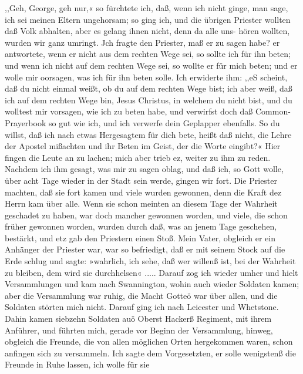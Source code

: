 
,,Geh, George, geh nur,« so fürchtete ich, daß, wenn ich nicht
ginge, man sage, ich sei meinen Eltern ungehorsam; so ging ich,
und die übrigen Priester wollten daß Volk abhalten, aber es
gelang ihnen nicht, denn da alle uns- hören wollten, wurden wir
ganz umringt. Jch fragte den Priester, maß er zu sagen habe?
er antwortete, wenn er nicht aus dem rechten Wege sei, so sollte
ich für ihn beten; und wenn ich nicht auf dem rechten Wege sei,
so wollte er für mich beten; und er wolle mir oorsagen, was ich
für ihn beten solle. Ich erwiderte ihm: ,,eS scheint, daß du nicht
einmal weißt, ob du auf dem rechten Wege bist; ich aber weiß,
daß ich auf dem rechten Wege bin, Jesus Christus, in welchem
du nicht bist, und du wolltest mir vorsagen, wie ich zu beten
habe, und verwirfst doch daß Common-Prayerbook so gut wie ich,
und ich verwerfe dein Geplapper ebenfalls. So du willst, daß ich
nach etwas Hergesagtem für dich bete, heißt daß nicht, die Lehre
der Apostel mißachten und ihr Beten im Geist, der die Worte
eingibt?« Hier fingen die Leute an zu lachen; mich aber trieb
ez, weiter zu ihm zu reden. Nachdem ich ihm gesagt, was
mir zu sagen oblag, und daß ich, so Gott wolle, über acht Tage wieder
in der Stadt sein werde, gingen wir fort. Die Priester machten,
daß sie fort kamen und viele wurden gewonnen, denn die Kraft dez
Herrn kam über alle. Wenn sie schon meinten an diesem Tage
der Wahrheit geschadet zu haben, war doch mancher gewonnen
worden, und viele, die schon früher gewonnen worden, wurden durch
daß, was an jenem Tage geschehen, bestärkt, und etz gab den
Priestern einen Stoß. Mein Vater, obgleich er ein Anhänger der
Priester war, war so befriedigt, daß er mit seinem Stock auf die
Erde schlug und sagte: »wahrlich, ich sehe, daß wer willenß ist,
bei der Wahrheit zu bleiben, dem wird sie durchhelsen« .....
Darauf zog ich wieder umher und hielt Versammlungen und
kam nach Swannington, wohin auch wieder Soldaten kamen;
aber die Versammlung war ruhig, die Macht Gotteö war
über allen, und die Soldaten störten mich nicht. Darauf ging
ich nach Leicester und Whetstone. Dahin kamen siebzehn Soldaten
auö Oberst Hackerß Regiment, mit ihrem Anführer, und führten
mich, gerade vor Beginn der Versammlung, hinweg, obgleich die
Freunde, die von allen möglichen Orten hergekommen waren,
schon anfingen sich zu versammeln. Ich sagte dem Vorgesetzten,
er solle wenigstenß die Freunde in Ruhe lassen, ich wolle für sie


